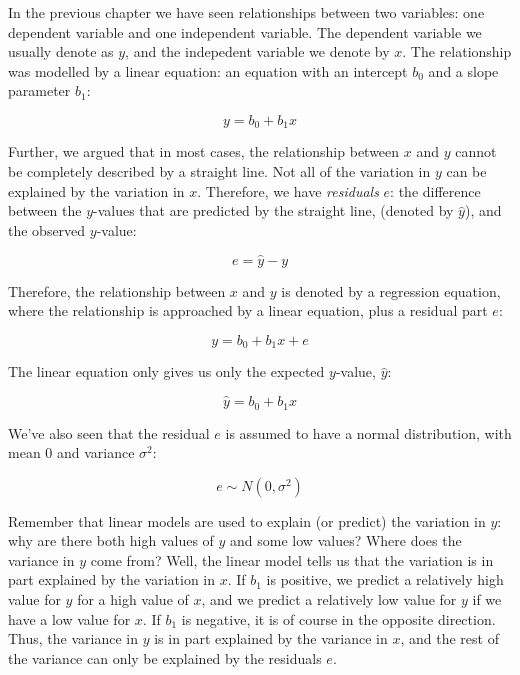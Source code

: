 \documentclass[]{report}\usepackage[]{graphicx}\usepackage[]{color}
\begin{document}
In the previous chapter we have seen relationships between two variables: one dependent variable and one independent variable. The dependent variable we usually denote as $y$, and the indepedent variable we denote by $x$. The relationship was modelled by a linear equation: an equation with an intercept $b_0$ and a slope parameter $b_1$:


\begin{equation}
y = b_0 + b_1 x
\end{equation}

Further, we argued that in most cases, the relationship between $x$ and $y$ cannot be completely described by a straight line. Not all of the variation in $y$ can be explained by the variation in $x$. Therefore, we have \textit{residuals} $e$: the difference between the $y$-values that are predicted by the straight line, (denoted by $\hat{y}$), and the observed $y$-value:

\begin{equation}
e = \hat{y} - y
\end{equation}

Therefore, the relationship between $x$ and $y$ is denoted by a regression equation, where the relationship is approached by a linear equation, plus a residual part $e$:

\begin{equation}
y = b_0 + b_1 x + e
\end{equation}

The linear equation only gives us only the expected $y$-value, $\hat{y}$:


\begin{equation}
\hat{y} = b_0 + b_1 x
\end{equation}


We've also seen that the residual $e$ is assumed to have a normal distribution, with mean 0 and variance $\sigma^2$:


\begin{equation}
e \sim N(0,\sigma^2)
\end{equation}

Remember that linear models are used to explain (or predict) the variation in $y$: why are there both high values of $y$ and some low values? Where does the variance in $y$ come from? Well, the linear model tells us that the variation is in part explained by the variation in $x$. If $b_1$ is positive, we predict a relatively high value for $y$ for a high value of $x$, and we predict a relatively low value for $y$ if we have a low value for $x$. If $b_1$ is negative, it is of course in the opposite direction. Thus, the variance in $y$ is in part explained by the variance in $x$, and the rest of the variance can only be explained by the residuals $e$.
\end{document}
